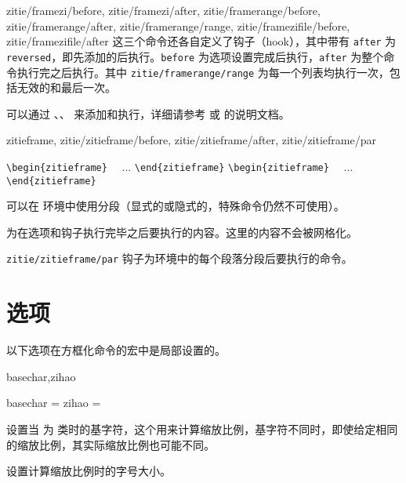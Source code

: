 \documentclass{ctxdoc}
\begin{document}
\begin{function}{
  zitie/framezi/before, zitie/framezi/after,
  zitie/framerange/before, zitie/framerange/after,
  zitie/framerange/range,
  zitie/framezifile/before, zitie/framezifile/after
}
  这三个命令还各自定义了钩子（hook），其中带有 \verb|after| 为 \verb|reversed|，即先添加的后执行。\verb|before| 为选项设置完成后执行，\verb|after| 为整个命令执行完之后执行。其中 \verb|zitie/framerange/range| 为每一个列表均执行一次，包括无效的和最后一次。

  可以通过 、、 来添加和执行，详细请参考  或  的说明文档。
\end{function}

\begin{function}{zitieframe,
  zitie/zitieframe/before, zitie/zitieframe/after,
  zitie/zitieframe/par
}
  \begin{syntax}
    \verb|\begin{zitieframe}| 
    ~~...
    \verb|\end{zitieframe}|
    \verb|\begin{zitieframe}|  
    ~~...
    \verb|\end{zitieframe}|
  \end{syntax}
  可以在  环境中使用分段（显式的或隐式的，特殊命令仍然不可使用）。

   为在选项和钩子执行完毕之后要执行的内容。这里的内容不会被网格化。

  \verb|zitie/zitieframe/par| 钩子为环境中的每个段落分段后要执行的命令。
\end{function}

\section{选项}\label{sec:options}

以下选项在方框化命令的宏中是局部设置的。

\begin{function}{basechar,zihao}
  \begin{syntax}
    basechar =  
    zihao =  
  \end{syntax}
   设置当  为  类时的基字符，这个用来计算缩放比例，基字符不同时，即使给定相同的缩放比例，其实际缩放比例也可能不同。

   设置计算缩放比例时的字号大小。
\end{function}
\end{document}
